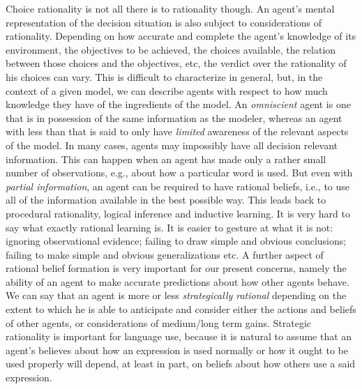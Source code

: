 \documentclass[a4paper]{article}
\begin{document}
Choice rationality is not all there is to rationality though.
An agent's mental representation of the decision situation is also subject to considerations of rationality. 
Depending on how accurate and complete the agent's knowledge of its environment, the objectives to be achieved, the choices available, the relation between those choices and the objectives, etc, the verdict over the rationality of his choices can vary.
This is difficult to characterize in general, but, in the context of a given model, we can describe agents with respect to how much knowledge they have of the ingredients of the model.
An \emph{omniscient} agent is one that is in possession of the same information as the modeler, whereas an agent with less than that is said to only have \emph{limited} awareness of the relevant aspects of the model.
In many cases, agents may impossibly have all decision relevant information.
This can happen when an agent has made only a rather small number of observations, e.g., about how a particular word is used.
But even with \emph{partial information}, an agent can be required to have rational beliefs, i.e., to use all of the information available in the best possible way.
This leads back to procedural rationality, logical inference and inductive learning.
It is very hard to say what exactly rational learning is.
It is easier to gesture at what it is not: ignoring observational evidence; failing to draw simple and obvious conclusions; failing to make simple and obvious generalizations etc.
A further aspect of rational belief formation is very important for our present concerns, namely the ability of an agent to make accurate predictions about how other agents behave.
We can say that an agent is more or less \emph{strategically rational} depending on the extent to which he is able to anticipate and consider either the actions and beliefs of other agents, or considerations of medium/long term gains.
Strategic rationality is important for language use, because it is natural to assume that an agent's believes about how an expression is used normally or how it ought to be used properly will depend, at least in part, on beliefs about how others use a said expression.
\end{document}
